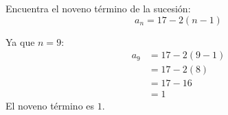 Encuentra el noveno término de la sucesión:
\[a_n=17-2(n-1)\]

\begin{solutionbox}{4.5cm}
    Ya que $n=9$:
    \begin{align*}
        a_9 & =17-2(9-1) \\
            & =17-2(8)   \\
            & =17-16     \\
            & =1
    \end{align*}
    El noveno término es $1$.
\end{solutionbox}
